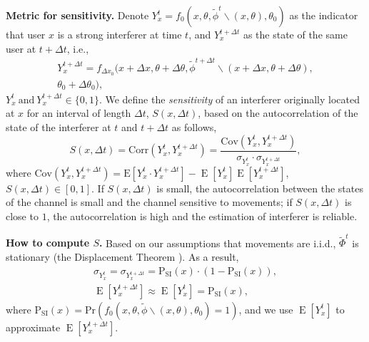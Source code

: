 \documentclass[10pt, conference, letterpaper]{IEEEtran}
\DeclareMathOperator*{\E}{\mathrm{E}}
\begin{document}
\textbf{Metric for sensitivity.} Denote $Y_x^t=f_0(x, \theta, \tilde{\phi}^t\backslash (x, \theta), \theta_0)$ as the indicator that user $x$ is a strong interferer at time $t$, and $Y_x^{t+\Delta t}$ as the state of the same user at $t+\Delta t$, i.e.,
\begin{multline*}
Y_{x}^{t+\Delta t} = f_{\Delta x_0}(x+\Delta x, \theta + \Delta\theta, \tilde{\phi}^{t+\Delta t}\backslash (x+\Delta x, \theta + \Delta\theta), \\
\theta_0 + \Delta\theta_0),
\end{multline*}
$Y_x^t \mathrm{~and~} Y_{x}^{t+\Delta t} \in \{0,1\}$.
We define the \emph{sensitivity} of an interferer originally located at $x$ for an interval of length $\Delta t$, $S(x, \Delta t)$, based on the autocorrelation of the state of the interferer at $t$ and $t+\Delta t$ as follows, 
\begin{equation}
S(x, \Delta t)
=\mathrm{Corr}(Y_x^t, Y_x^{t+\Delta t})
=\frac{\mathrm{Cov}(Y_x^t, Y_x^{t+\Delta t})}{\sigma_{Y_x^t}\cdot \sigma_{Y_x^{t+\Delta t}}},
\end{equation}
where $\mathrm{Cov}(Y_x^t, Y_x^{t+\Delta t}) = \mathrm{E}[Y_x^t\cdot Y_x^{t + \Delta t}] - \E[Y_x^t]\E[Y_x^{t+\Delta t}]$, $S(x, \Delta t)\in [0,1]$. If $S(x, \Delta t)$ is small, the autocorrelation between the states of the channel is small and the channel sensitive to movements; if $S(x, \Delta t)$ is close to $1$, the autocorrelation is high and the estimation of interferer is reliable.


\textbf{How to compute \boldmath$S$.}
Based on our assumptions that movements are i.i.d., $\tilde{\Phi}^t$ is stationary (the Displacement Theorem \cite{poisson}).
As a result, 
\begin{gather*}
\sigma_{Y_x^t} = \sigma_{Y_x^{t+\Delta t}}  =\mathrm{P}_{\mathrm{SI}}(x)\cdot (1-\mathrm{P}_{\mathrm{SI}}(x)),\\
\E[Y_x^{t+\Delta t}] \approx \E[Y_x^{t}] = \mathrm{P_{SI}}(x),
\end{gather*}
where $\mathrm{P}_{\mathrm{SI}}(x)=\mathrm{Pr}(f_0(x,\theta,\tilde{\phi}\backslash(x,\theta), \theta_0)=1)$, 
and we use $\E[Y_x^{t}]$ to approximate $\E[Y_x^{t+\Delta t}]$. 
\end{document}
